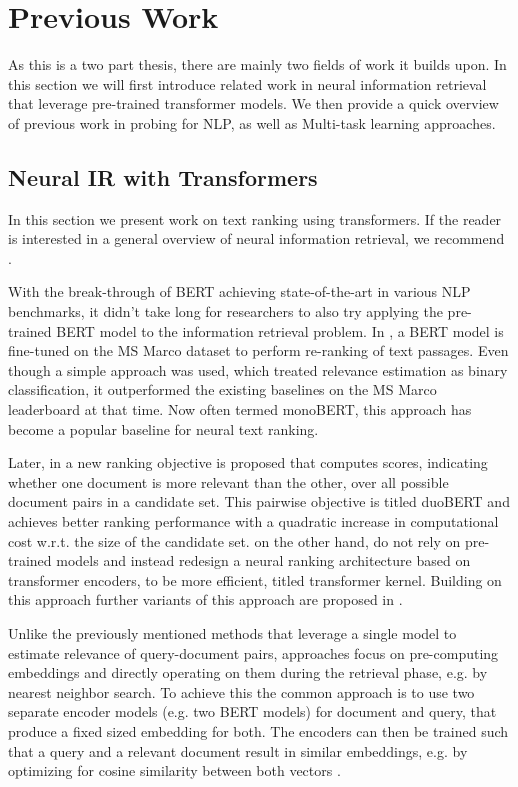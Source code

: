 \chapter{Previous Work}
\label{chap:prev}
As this is a two part thesis, there are mainly two fields of work it builds upon. In this section we will first introduce related work in neural information retrieval that leverage pre-trained transformer models. We then provide a quick overview of previous work in probing for NLP, as well as Multi-task learning approaches.

\section{Neural IR with Transformers}
In this section we present work on text ranking using transformers. If the reader is interested in a general overview of neural information retrieval, we recommend \cite{mitra2018an, Onal2017NeuralIR, Guo2020ADL}.

With the break-through of BERT \cite{devlin-etal-2019-bert} achieving state-of-the-art in various NLP benchmarks, it didn't take long for researchers to also try applying the pre-trained BERT model to the information retrieval problem. In \cite{Nogueira2019PassageRW}, a BERT model is fine-tuned on the MS Marco dataset \cite{DBLP:journals/corr/NguyenRSGTMD16} to perform re-ranking of text passages. Even though a simple approach was used, which treated relevance estimation as binary classification, it outperformed the existing baselines on the MS Marco leaderboard at that time. Now often termed monoBERT, this approach has become a popular baseline for neural text ranking.

Later, in \cite{Nogueira2019MultiStageDR} a new ranking objective is proposed that computes scores, indicating whether one document is more relevant than the other, over all possible document pairs in a candidate set. This pairwise objective is titled duoBERT and achieves better ranking performance with a quadratic increase in computational cost w.r.t. the size of the candidate set. \cite{DBLP:journals/corr/abs-1912-01385} on the other hand, do not rely on pre-trained models and instead redesign a neural ranking architecture based on transformer encoders, to be more efficient, titled transformer kernel. Building on this approach further variants of this approach are proposed in \cite{Hofsttter2020LocalSO, 10.1145/3404835.3463049}.

Unlike the previously mentioned methods that leverage a single model to estimate relevance of query-document pairs,  approaches focus on pre-computing embeddings and directly operating on them during the retrieval phase, e.g. by nearest neighbor search. To achieve this the common approach is to use two separate encoder models (e.g. two BERT models) for document and query, that produce a fixed sized embedding for both. The encoders can then be trained such that a query and a relevant document result in similar embeddings, e.g. by optimizing for cosine similarity between both vectors \cite{Humeau2020Poly-encoders, 10.1145/3397271.3401075, DBLP:journals/corr/abs-1908-10084}.

